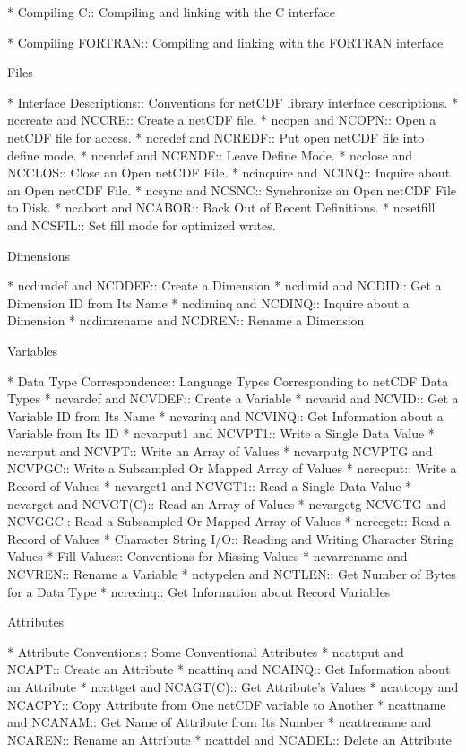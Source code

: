 * Compiling C::                 Compiling and linking with the C interface

* Compiling FORTRAN::           Compiling and linking with the FORTRAN interface

Files

* Interface Descriptions::   Conventions for netCDF library interface
                             descriptions.
* nccreate and NCCRE::       Create a netCDF file.
* ncopen and NCOPN::         Open a netCDF file for access.
* ncredef and NCREDF::       Put open netCDF file into define mode.
* ncendef and NCENDF::       Leave Define Mode.
* ncclose and NCCLOS::       Close an Open netCDF File.
* ncinquire and NCINQ::      Inquire about an Open netCDF File.
* ncsync and NCSNC::         Synchronize an Open netCDF File to Disk.
* ncabort and NCABOR::       Back Out of Recent Definitions.
* ncsetfill and NCSFIL::     Set fill mode for optimized writes.

Dimensions

* ncdimdef and NCDDEF::    Create a Dimension
* ncdimid and NCDID::      Get a Dimension ID from Its Name
* ncdiminq and NCDINQ::    Inquire about a Dimension
* ncdimrename and NCDREN:: Rename a Dimension

Variables

* Data Type Correspondence:: Language Types Corresponding to netCDF Data Types
* ncvardef and NCVDEF::     Create a Variable
* ncvarid and NCVID::       Get a Variable ID from Its Name
* ncvarinq and NCVINQ::     Get Information about a Variable from Its ID
* ncvarput1 and NCVPT1::    Write a Single Data Value
* ncvarput and NCVPT::      Write an Array of Values
* ncvarputg NCVPTG and NCVPGC::    Write a Subsampled Or Mapped Array of Values
* ncrecput::                Write a Record of Values
* ncvarget1 and NCVGT1::    Read a Single Data Value
* ncvarget and NCVGT(C)::   Read an Array of Values
* ncvargetg NCVGTG and NCVGGC::    Read a Subsampled Or Mapped Array of Values
* ncrecget::                Read a Record of Values
* Character String I/O::    Reading and Writing Character String Values
* Fill Values::             Conventions for Missing Values
* ncvarrename and NCVREN::  Rename a Variable
* nctypelen and NCTLEN::    Get Number of Bytes for a Data Type
* ncrecinq::                Get Information about Record Variables

Attributes

* Attribute Conventions::       Some Conventional Attributes
* ncattput and NCAPT::          Create an Attribute
* ncattinq and NCAINQ::         Get Information about an Attribute
* ncattget and NCAGT(C)::       Get Attribute's Values
* ncattcopy and NCACPY::        Copy Attribute from One netCDF variable to Another
* ncattname and NCANAM::        Get Name of Attribute from Its Number
* ncattrename and NCAREN::      Rename an Attribute
* ncattdel and NCADEL::         Delete an Attribute

